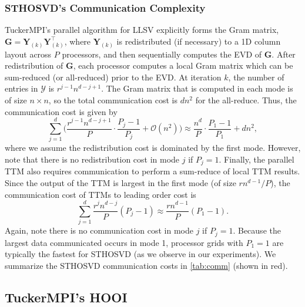     \subsubsection{STHOSVD's Communication Complexity} \label{sec:STHOSVD's Communication Complexity}

        TuckerMPI's parallel algorithm for LLSV explicitly forms the Gram
        matrix, $\mathbf{G} = \mathbf{Y}_{(k)}\mathbf{Y}_{(k)}^\intercal$,
        where $\mathbf{Y}_{(k)}$ is redistributed (if necessary) to a 1D column
        layout across $P$ processors, and then sequentially computes the EVD of
        $\mathbf{G}$. After redistribution of $\mathbf{G}$, each processor
        computes a local Gram matrix which can be sum-reduced (or all-reduced)
        prior to the EVD. At iteration $k$, the number of entries in
        $\mathcal{Y}$ is $r^{j-1}n^{d-j+1}$. The Gram matrix that is computed in
        each mode is of size $n \times n$, so the total communication cost is
        $dn^2$ for the all-reduce. Thus, the communication cost is given by
        \begin{equation*}
            \sum_{j=1}^{d} \bigg(\frac{r^{j-1}n^{d-j+1}}{P}\cdot \frac{P_j - 1}{P_j} + \mathcal{O}(n^2)\bigg) \approx \frac{n^{d}}{P}\cdot \frac{P_1 - 1}{P_1} + dn^2,
        \end{equation*}
        where we assume the redistribution cost is dominated by the first mode. However,
        note that there is no redistribution cost in mode $j$ if $P_j=1$. Finally, the
        parallel TTM also requires communication to perform a sum-reduce of local TTM
        results. Since the output of the TTM is largest in the first mode (of size
        $rn^{d-1}/P$), the communication cost of TTMs to leading order cost is
        \begin{equation*}
            \sum_{j=1}^{d} \frac{r^{j}n^{d-j}}{P}(P_j - 1) \approx \frac{rn^{d-1}}{P}(P_1 - 1).
        \end{equation*}
        Again, note there is no communication cost in mode $j$ if $P_j=1$.
        Because the largest data communicated occurs in mode 1, processor grids
        with $P_1=1$ are typically the fastest for STHOSVD (as we observe in our
        experiments). We summarize the STHOSVD communication costs in
        \cref{tab:comm} (shown in red).

\subsection{TuckerMPI's HOOI} \label{sec:TuckerMPI's HOOI}
